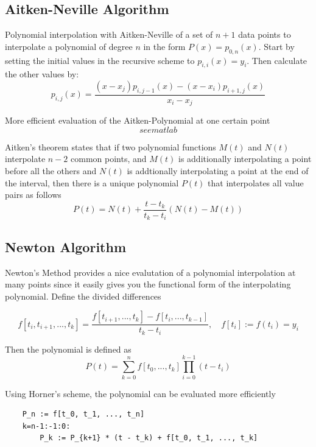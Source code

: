 \documentclass[
    a4paper,
    11pt
]{article}
\begin{document}
\subsection{Aitken-Neville Algorithm}

Polynomial interpolation with Aitken-Neville of a set of $n+1$ data points to
interpolate a polynomial of degree $n$ in the form $P(x) = p_{0,n}(x)$. Start by
setting the initial values in the recursive scheme to $p_{i,i}(x)=y_i$. Then
calculate the other values by:
\begin{equation}
    p_{i,j}(x) = \frac{(x-x_j)p_{i,j-1}(x) - (x-x_i)p_{i+1,j}(x)}{x_i - x_j}
\end{equation}

More efficient evaluation of the Aitken-Polynomial at one certain point
\begin{equation}
    see matlab
\end{equation}

Aitken's theorem states that if two polynomial functions $M(t)$ and $N(t)$
interpolate $n-2$ common points, and $M(t)$ is additionally interpolating a
point before all the others and $N(t)$ is addtionally interpolating a point at
the end of the interval, then there is a unique polynomial $P(t)$ that
interpolates all value pairs as follows
\begin{equation}
    P(t) = N(t) + \frac{t - t_k}{t_k - t_i} (N(t) - M(t))
\end{equation}

\subsection{Newton Algorithm}

Newton's Method provides a nice evalutation of a polynomial interpolation at
many points since it easily gives you the functional form of the interpolating
polynomial. Define the divided differences

\begin{equation}
    f[t_i, t_{i+1}, ..., t_k] =
    \frac{f[t_{i+1}, ..., t_k] - f[t_i, ..., t_{k-1}]}{t_k - t_i},
    \quad
    f[t_i] := f(t_i) = y_i
\end{equation}

Then the polynomial is defined as
\begin{equation}
    P(t) = \sum_{k=0}^{n} f[t_0, ..., t_k] \prod_{i=0}^{k-1}(t - t_i)
\end{equation}

Using Horner's scheme, the polynomial can be evaluated more efficiently
\begin{verbatim}
    P_n := f[t_0, t_1, ..., t_n]
    k=n-1:-1:0:
        P_k := P_{k+1} * (t - t_k) + f[t_0, t_1, ..., t_k]
\end{verbatim}
\end{document}

